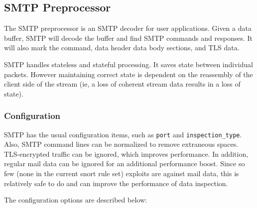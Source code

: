\documentclass[english]{report}
\begin{document}
\subsection{SMTP Preprocessor}
\label{SMTP}

The SMTP preprocessor is an SMTP decoder for user applications.  Given a data
buffer, SMTP will decode the buffer and find SMTP commands and responses.  It
will also mark the command, data header data body sections, and TLS data.

SMTP handles stateless and stateful processing.  It saves state between
individual packets.  However maintaining correct state is dependent on the
reassembly of the client side of the stream (ie, a loss of coherent stream data
results in a loss of state).

\subsubsection{Configuration}

SMTP has the usual configuration items, such as \texttt{port} and
\texttt{inspection\_type}.  Also, SMTP command lines can be normalized to
remove extraneous spaces.  TLS-encrypted traffic can be ignored, which improves
performance.  In addition, regular mail data can be ignored for an additional
performance boost.  Since so few (none in the current snort rule set) exploits
are against mail data, this is relatively safe to do and can improve the
performance of data inspection.

The configuration options are described below:
\end{document}
